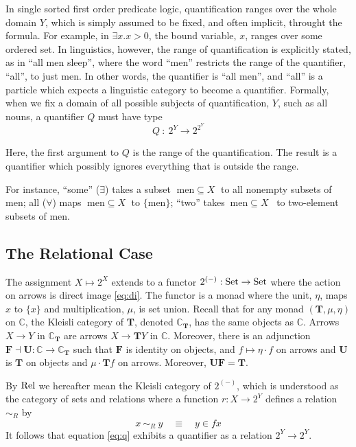 In single sorted first order predicate logic, quantification ranges
over the whole domain $Y$, which is simply assumed to be fixed, and
often implicit, throught the formula. For example, in $\exists x. x >
0$, the bound variable, $x$, ranges over some ordered set. In
linguistics, however, the range of quantification is explicitly
stated, as in ``all men sleep'', where the word ``men'' restricts the
range of the quantifier, ``all'', to just men. In other words, the
quantifier is ``all men'', and ``all'' is a particle which expects a
linguistic category to become a quantifier. Formally, when we fix a
domain of all possible subjects of quantification, $Y$, such as all
nouns, a quantifier $Q$ must have type
\begin{equation}\label{eq:q}
Q ~: ~2^Y \to 2^{2^Y}
\end{equation}

Here, the first argument to $Q$ is the range of the quantification. The
result is a quantifier which possibly ignores everything that is
outside the range.

For instance, ``some'' ($\exists$) takes a subset
$\;\mathrm{men}\subseteq X\;$ to all nonempty subsets of $\mathrm{men}$; all
($\forall$) maps $\;\mathrm{men}\subseteq X\;$ to $ \{ \mathrm{men}
\}$; ``two'' takes $~\mathrm{men} \subseteq X$~ to two-element subsets of
$\mathrm{men}$.

\subsection{The Relational Case}
The assignment $X \mapsto 2^X$ extends to a functor $2^{(-)} : \mathrm{Set} \to
\mathrm{Set}$ where the action on arrows is direct image \eqref{eq:di}.
The functor is a monad where the unit, $\eta$, maps $x$ to $\{x\}$ and
multiplication, $\mu$, is set union. Recall \cite{CWM} that for any
monad $(\mathbf{T}, \mu, \eta)$ on $\mathbb{C}$, the Kleisli category
of $\mathbf{T}$, denoted $\mathbb{C}_{\mathbf{T}}$, has the same
objects as $\mathbb{C}$. Arrows $X \to Y$ in $\mathbb{C}_{\mathbf{T}}$
are arrows $X \to \mathbf{T}Y$ in $\mathbb{C}$. Moreover, there is an
adjunction $\mathbf{F} \dashv \mathbf{U} : \mathbb{C} \to
\mathbb{C}_\mathbf{T}$ such that $\mathbf{F}$ is identity on objects,
and $f \mapsto \eta \cdot f$ on arrows and $\mathbf{U}$ is $\mathbf{T}$ on
objects and $\mu\cdot\mathbf{T}f$ on arrows. Moreover,
$\mathbf{U}\mathbf{F} = \mathbf{T}$.

By $\mathrm{Rel}$ we hereafter mean the Kleisli category of $2^{(-)}$, which is 
understood as the category of sets and relations where a function $r :
X \to 2^Y$ defines a relation $\sim_R$ by
\[
x ~\sim_R~ y \quad \equiv \quad y \in fx
\]
\renewcommand{\wp}[1]{2^{#1}} It follows that equation \eqref{eq:q}  exhibits a
quantifier as a relation $\wp{Y} \to \wp{Y}$.  


